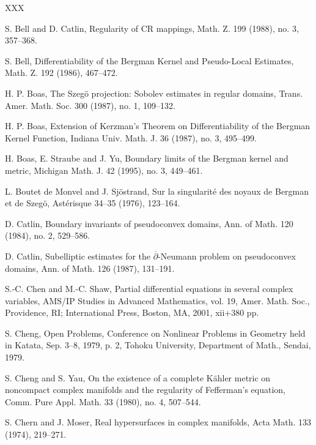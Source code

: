 \documentclass[a4paper,centertags,oneside,12pt]{amsart}
\numberwithin{equation}{section}
\begin{document}
\begin{thebibliography}{XXX}

 S. Bell and D. Catlin, Regularity of CR mappings, Math. Z. 199 (1988), no. 3, 357--368.

 S. Bell, Differentiability of the Bergman Kernel and Pseudo-Local Estimates, Math. Z. 192 (1986), 467--472.

 H. P. Boas, The Szeg\"o projection: Sobolev estimates in regular domains, Trans. Amer. Math. Soc. 300 (1987), no. 1, 109--132.

 H. P. Boas, Extension of Kerzman's Theorem on Differentiability of the Bergman Kernel Function, Indiana Univ. Math. J. 36 (1987), no. 3, 495--499.

 H. Boas, E. Straube and J. Yu, Boundary limits of the Bergman kernel and metric, Michigan Math. J. 42 (1995), no. 3, 449--461.

 L. Boutet de Monvel and J. Sj\"ostrand, Sur la singularit\'e des noyaux de Bergman et de Szeg\"o, Ast\'erisque 34--35 (1976), 123--164.


 D. Catlin, Boundary invariants of pseudoconvex domains, Ann. of Math. 120 (1984), no. 2, 529--586.

 D. Catlin, Subelliptic estimates for the $\overline\partial$-Neumann problem on pseudoconvex domains, Ann. of Math. 126 (1987), 131--191.

 S.-C. Chen and M.-C. Shaw, Partial differential equations in several complex variables, AMS/IP Studies in Advanced Mathematics, vol. 19, Amer. Math. Soc., Providence, RI; International Press, Boston, MA, 2001, xii+380 pp.

 S. Cheng, Open Problems, Conference on Nonlinear Problems in Geometry held in Katata, Sep. 3--8, 1979, p. 2, Tohoku University, Department of Math., Sendai, 1979.

 S. Cheng and S. Yau, On the existence of a complete K\"ahler metric on noncompact complex manifolds and the regularity of Fefferman's equation, Comm. Pure Appl. Math. 33 (1980), no. 4, 507--544.

 S. Chern and J. Moser, Real hypersurfaces in complex manifolds, Acta Math. 133 (1974), 219--271.


\end{thebibliography}
\end{document}

